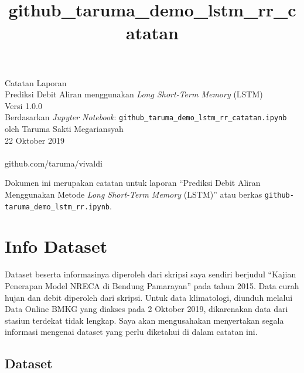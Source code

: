 \documentclass[11pt]{article}
\title{github\_taruma\_demo\_lstm\_rr\_catatan}
\begin{document}
  
	\begin{titlepage}
		\vspace*{\fill}
		\begin{center}
 		\normalsize Catatan Laporan\\
		\huge Prediksi Debit Aliran menggunakan \emph{Long Short-Term Memory} (LSTM)\\ 
		\normalsize Versi 1.0.0 \\[0.2cm]
      	\small Berdasarkan \emph{Jupyter Notebook}: \texttt{github\_taruma\_demo\_lstm\_rr\_catatan.ipynb} \\[0.5cm]
		\normalsize oleh Taruma Sakti Megariansyah\\[0.5cm]
      	\normalsize 22 Oktober 2019\\[1cm]
    	\\
      	\normalsize github.com/taruma/vivaldi
		\end{center}
    	\vspace*{\fill}
	\end{titlepage}
    
    

    
    Dokumen ini merupakan catatan untuk laporan ``Prediksi Debit Aliran
Menggunakan Metode \emph{Long Short-Term Memory} (LSTM)'' atau berkas
\texttt{github-taruma\_demo\_lstm\_rr.ipynb}.

    \hypertarget{info-dataset}{%
\section{Info Dataset}\label{info-dataset}}

Dataset beserta informasinya diperoleh dari skripsi saya sendiri
berjudul ``Kajian Penerapan Model NRECA di Bendung Pamarayan'' pada
tahun 2015. Data curah hujan dan debit diperoleh dari skripsi. Untuk
data klimatologi, diunduh melalui Data Online BMKG yang diakses pada 2
Oktober 2019, dikarenakan data dari stasiun terdekat tidak lengkap. Saya
akan mengusahakan menyertakan segala informasi mengenai dataset yang
perlu diketahui di dalam catatan ini.

    \hypertarget{dataset}{%
\subsection{Dataset}\label{dataset}}
\end{document}
